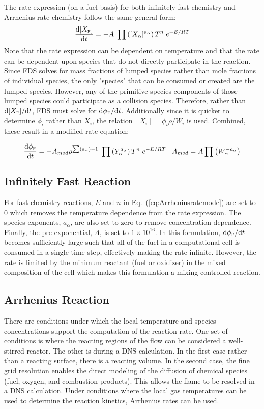 The rate expression (on a fuel basis) for both infinitely fast chemistry and Arrhenius rate chemistry follow the same general form:
\begin{equation}\label{eq:Arrheniusrateeqn}
\frac{\mbox{d}[X_{\tiny \hbox{F}}]}{\mbox{d}t} = -A \; \prod \left([X_{\alpha}]^{a_{\alpha}} \right) T^n \; e^{-E/RT} 
\end{equation}
Note that the rate expression can be dependent on temperature and that the rate can be dependent upon species that do not directly participate in the reaction. Since FDS solves for mass fractions of lumped species rather than mole fractions of individual species, the only "species" that can be consumed or created are the lumped species.  However, any of the primitive species components of those lumped species could participate as a collision species.  Therefore, rather than $\mbox{d}[X_{\tiny \hbox{F}}]/\mbox{d}t$,  FDS must solve for $\mbox{d}\phi_{\tiny \hbox{F}}/\mbox{d}t$.  Additionally since it is quicker to determine $\phi_i$ rather than $X_i$, the relation $[X_i]=\phi_i \rho/W_i$ is used.  Combined, these result in a modified rate equation:

\begin{equation}\label{eq:Arrheniusratemode}
\frac{\mbox{d}\phi_{\tiny \hbox{F}}}{\mbox{d}t} = -A_{mod} \rho^{\sum (a_{\alpha}) -1} \; \prod \left(Y_{\alpha}^{a_{\alpha}} \right) T^n \; e^{-E/RT} \;\;\; A_{mod} = A \prod \left(W_{\alpha}^{-a_{\alpha}} \right)  
\end{equation}

\subsection{Infinitely Fast Reaction}
For fast chemistry reactions, $E$ and $n$ in Eq.~(\ref{eq:Arrheniusratemode}) are set to $0$ which removes the temperature dependence from the rate expression. The species exponents, $a_{\alpha}$, are also set to zero to remove concentration dependence. Finally, the pre-exponential, $A$, is set to $1 \times 10^{16}$. In this formulation, $\mbox{d}\phi_{\tiny \hbox{F}}/\mbox{d}t$ becomes sufficiently large such that all of the fuel in a computational cell is consumed in a single time step, effectively making the rate infinite. However, the rate is limited by the minimum reactant (fuel or oxidizer) in the mixed composition of the cell which makes this formulation a mixing-controlled reaction.   

\subsection{Arrhenius Reaction}
There are conditions under which the local temperature and species concentrations support the computation of the reaction rate.  One set of conditions is where the reacting regions of the flow can be considered a well-stirred reactor.  The other is during a DNS calculation.  In the first case rather than a reacting surface, there is a reacting volume.  In the second case, the fine grid resolution enables the direct modeling of the diffusion of chemical species (fuel,
oxygen, and combustion products).  This allows the flame to be resolved in a DNS calculation.  Under conditions where the local gas
temperatures can be used to determine the reaction kinetics, Arrhenius rates can be used.


